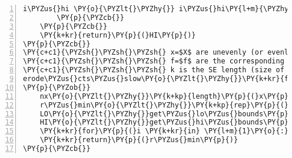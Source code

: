 \begin{Verbatim}[commandchars=\\\{\},codes={\catcode`\$=3\catcode`\^=7\catcode`\_=8},gobble=0,numbers=left,fontfamily=fvm,fontshape=n,fontsize=\footnotesize,tabsize=2]
			i\PYZus{}hi \PY{o}{\PYZlt{}\PYZhy{}} i\PYZus{}hi\PY{l+m}{\PYZhy{}1} 
		\PY{p}{\PYZcb{}}
	\PY{p}{\PYZcb{}}
	\PY{k+kr}{return}\PY{p}{(}HI\PY{p}{)}
\PY{p}{\PYZcb{}}
\PY{c+c1}{\PYZsh{}\PYZsh{}\PYZsh{} x=$X$ are unevenly (or evenly) spaced locations of the intensities}
\PY{c+c1}{\PYZsh{}\PYZsh{}\PYZsh{} f=$f$ are the corresponding intensity values}
\PY{c+c1}{\PYZsh{}\PYZsh{}\PYZsh{} k is the SE length (size of $B$)}
erode\PYZus{}cts\PYZus{}slow\PY{o}{\PYZlt{}\PYZhy{}}\PY{k+kr}{function}\PY{p}{(}x\PY{p}{,}f\PY{p}{,}k\PY{p}{)}
\PY{p}{\PYZob{}}
	nx\PY{o}{\PYZlt{}\PYZhy{}}\PY{k+kp}{length}\PY{p}{(}x\PY{p}{)}
	r\PYZus{}min\PY{o}{\PYZlt{}\PYZhy{}}\PY{k+kp}{rep}\PY{p}{(}\PY{l+m}{0}\PY{p}{,}nx\PY{p}{)}
	LO\PY{o}{\PYZlt{}\PYZhy{}}get\PYZus{}lo\PYZus{}bounds\PY{p}{(}x\PY{p}{,}k\PY{p}{)}
	HI\PY{o}{\PYZlt{}\PYZhy{}}get\PYZus{}hi\PYZus{}bounds\PY{p}{(}x\PY{p}{,}k\PY{p}{)}
	\PY{k+kr}{for}\PY{p}{(}i \PY{k+kr}{in} \PY{l+m}{1}\PY{o}{:}nx\PY{p}{)} r\PYZus{}min\PY{p}{[}i\PY{p}{]}\PY{o}{\PYZlt{}\PYZhy{}}\PY{k+kp}{min}\PY{p}{(}f\PY{p}{[}LO\PY{p}{[}i\PY{p}{]}\PY{o}{:}HI\PY{p}{[}i\PY{p}{]]}\PY{p}{)}
	\PY{k+kr}{return}\PY{p}{(}r\PYZus{}min\PY{p}{)}
\PY{p}{\PYZcb{}}
\end{Verbatim}
